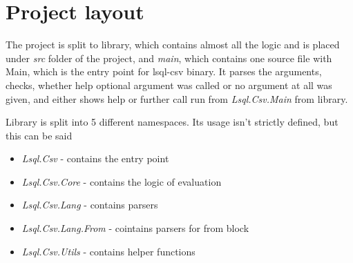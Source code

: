 \section{Project layout}

The project is split to library, which contains almost all the logic and is placed under
\textit{src} folder of the project, and \textit{main}, which contains one source file
with Main, which is the entry point for lsql-csv binary. 
It parses the arguments, checks, whether help optional argument was called or no argument at all was given, 
and either shows help or further call run from \textit{Lsql.Csv.Main} from library.

Library is split into 5 different namespaces. Its usage isn't strictly defined, but this can be said
\begin{itemize}
    \item \textit{Lsql.Csv} - contains the entry point
    \item \textit{Lsql.Csv.Core} - contains the logic of evaluation
    \item \textit{Lsql.Csv.Lang} - contains parsers
    \item \textit{Lsql.Csv.Lang.From} - cointains parsers for from block
    \item \textit{Lsql.Csv.Utils} - contains helper functions
\end{itemize}

